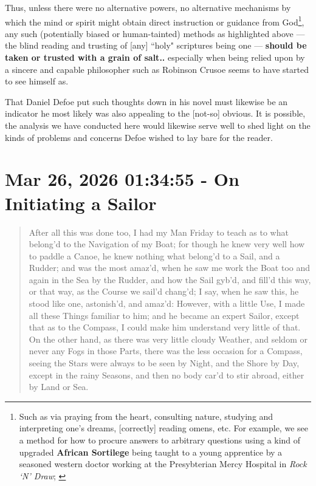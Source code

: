 \documentclass[a4paper]{article}
\begin{document}
Thus, unless there were no alternative powers, no alternative mechanisms by which the mind or spirit might obtain direct instruction or guidance from God\footnote{Such as via praying from the heart, consulting nature, studying and interpreting one's dreams, [correctly] reading omens, etc. For example, we see a method for how to procure answers to arbitrary questions using a kind of upgraded \textbf{African Sortilege} being taught to a young apprentice by a seasoned western doctor working at the Presybterian Mercy Hospital in \textit{Rock `N' Draw}; \cite{lutalo2025rock}}, any such (potentially biased or human-tainted) methods as highlighted above --- the blind reading and trusting of [any] ``holy" scriptures being one --- \textbf{should be taken or trusted with a grain of salt..} especially when being relied upon by a sincere and capable philosopher such as Robinson Crusoe seems to have started to see himself as.


That Daniel Defoe put such thoughts down in his novel must likewise be an indicator he most likely was also appealing to the [not-so] obvious. It is possible, the analysis we have conducted here would likewise serve well to shed light on the kinds of problems and concerns Defoe wished to lay bare for the reader.




\section{Mar 26, 2026 01:34:55 - On Initiating a Sailor}
\label{SEC60}


\noindent
\begin{minipage}{1\textwidth}
\vspace{1em}
\begin{quotation}
{\ttfamily


After all this was done too, I had my Man Friday to teach as to what belong’d to the Navigation of my Boat; for though he knew very well how to paddle a Canoe, he knew nothing what belong’d to a Sail, and a Rudder; and was the most amaz’d, when he saw me work the Boat too and again in the Sea by the Rudder, and how the Sail gyb’d, and fill’d this way, or that way, as the Course we sail’d chang’d; I say, when he saw this, he stood like one, astonish’d, and amaz’d: However, with a little Use, I made all these Things familiar to him; and he became an expert Sailor, except that as to the Compass, I could make him understand very little of that. On the other hand, as there was very little cloudy Weather, and seldom or never any Fogs in those Parts, there was the less occasion for a Compass, seeing the Stars were always to be seen by Night, and the Shore by Day, except in the rainy Seasons, and then no body car’d to stir abroad, either by Land or Sea.


}
\end{quotation}
\vspace{1em}
\end{minipage}
\end{document}

